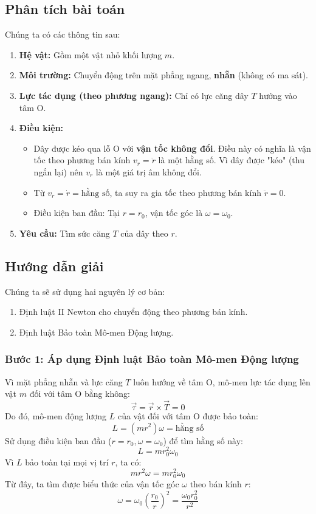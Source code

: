 \documentclass[12pt, a4paper]{article}
\begin{document}
	\subsection*{Phân tích bài toán}
	Chúng ta có các thông tin sau:
	\begin{enumerate}
		\item \textbf{Hệ vật:} Gồm một vật nhỏ khối lượng $m$.
		\item \textbf{Môi trường:} Chuyển động trên mặt phẳng ngang, \textbf{nhẵn} (không có ma sát).
		\item \textbf{Lực tác dụng (theo phương ngang):} Chỉ có lực căng dây $T$ hướng vào tâm O.
		\item \textbf{Điều kiện:}
		\begin{itemize}
			\item Dây được kéo qua lỗ O với \textbf{vận tốc không đổi}. Điều này có nghĩa là vận tốc theo phương bán kính $v_r = \dot{r}$ là một hằng số. Vì dây được "kéo" (thu ngắn lại) nên $v_r$ là một giá trị âm không đổi.
			\item Từ $v_r = \dot{r} = \text{hằng số}$, ta suy ra gia tốc theo phương bán kính $\ddot{r} = 0$.
			\item Điều kiện ban đầu: Tại $r = r_0$, vận tốc góc là $\omega = \omega_0$.
		\end{itemize}
		\item \textbf{Yêu cầu:} Tìm sức căng $T$ của dây theo $r$.
	\end{enumerate}
	
	\subsection*{Hướng dẫn giải}
	Chúng ta sẽ sử dụng hai nguyên lý cơ bản:
	\begin{enumerate}
		\item Định luật II Newton cho chuyển động theo phương bán kính.
		\item Định luật Bảo toàn Mô-men Động lượng.
	\end{enumerate}
	
	\subsubsection*{Bước 1: Áp dụng Định luật Bảo toàn Mô-men Động lượng}
	Vì mặt phẳng nhẵn và lực căng $T$ luôn hướng về tâm O, mô-men lực tác dụng lên vật $m$ đối với tâm O bằng không:
	$$ \vec{\tau} = \vec{r} \times \vec{T} = 0 $$
	Do đó, mô-men động lượng $L$ của vật đối với tâm O được bảo toàn:
	$$ L =  (m r^2) \omega = \text{hằng số} $$
	Sử dụng điều kiện ban đầu ($r = r_0, \omega = \omega_0$) để tìm hằng số này:
	$$ L = m r_0^2 \omega_0 $$
	Vì $L$ bảo toàn tại mọi vị trí $r$, ta có:
	$$ m r^2 \omega = m r_0^2 \omega_0 $$
	Từ đây, ta tìm được biểu thức của vận tốc góc $\omega$ theo bán kính $r$:
	$$ \omega = \omega_0 \left( \frac{r_0}{r} \right)^2 = \frac{\omega_0 r_0^2}{r^2} $$
	
\end{document}
